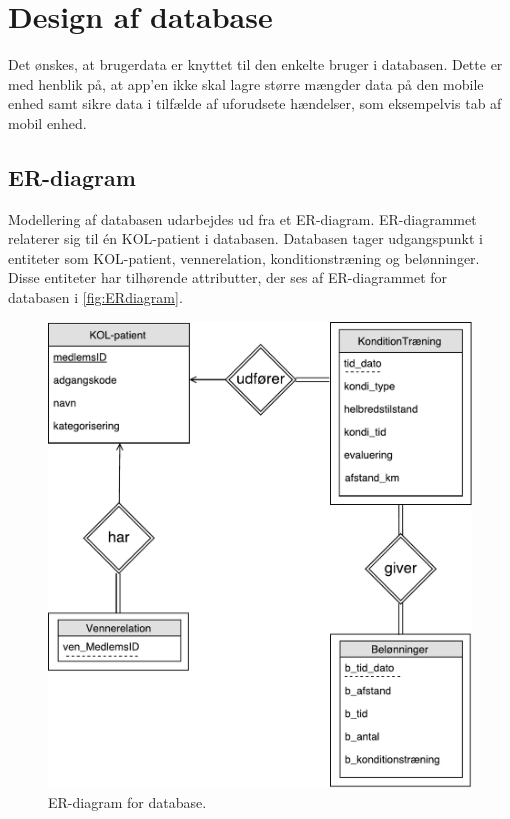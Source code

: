 \newpage
\section{Design af database} \label{sec:ER}
Det ønskes, at brugerdata er knyttet til den enkelte bruger i databasen. Dette er med henblik på, at app'en ikke skal lagre større mængder data på den mobile enhed samt sikre data i tilfælde af uforudsete hændelser, som eksempelvis tab af mobil enhed. 

\subsection*{ER-diagram}
Modellering af databasen udarbejdes ud fra et ER-diagram. ER-diagrammet relaterer sig til én KOL-patient i databasen. Databasen tager udgangspunkt i entiteter som KOL-patient, vennerelation, konditionstræning og belønninger. Disse entiteter har tilhørende attributter, der ses af ER-diagrammet for databasen i \autoref{fig:ERdiagram}.

\begin{figure} [H]
\centering
\includegraphics[width=1\textwidth]{figures/Aktivitetsdiagram/ERdiagram}
\caption{ER-diagram for database.}
\label{fig:ERdiagram}
\end{figure} 

